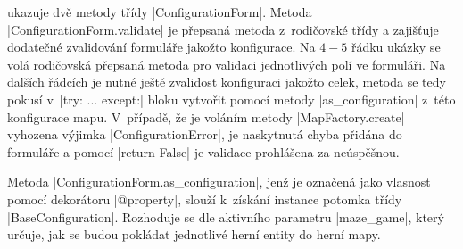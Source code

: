  ukazuje dvě metody třídy \ic|ConfigurationForm|. Metoda \ic|ConfigurationForm.validate| je přepsaná metoda z~rodičovské třídy a zajišťuje dodatečné zvalidování formuláře jakožto konfigurace. Na $4-5$ řádku ukázky se volá rodičovská přepsaná metoda pro validaci jednotlivých polí ve formuláři. Na dalších řádcích je nutné ještě zvalidost konfiguraci jakožto celek, metoda se tedy pokusí v~\ic|try: ... except:| bloku vytvořit pomocí metody \ic|as_configuration| z~této konfigurace mapu. V~případě, že je voláním metody \ic|MapFactory.create| vyhozena výjimka \ic|ConfigurationError|, je naskytnutá chyba přidána do formuláře a pomocí \ic|return False| je validace prohlášena za neúspěšnou. 

\begin{sloppypar}
    Metoda \ic|ConfigurationForm.as_configuration|, jenž je označená jako vlasnost pomocí dekorátoru \ic|@property|, slouží k~získání instance potomka třídy \ic|BaseConfiguration|. Rozhoduje se dle aktivního parametru \ic|maze_game|, který určuje, jak se budou pokládat jednotlivé herní entity do herní mapy.
\end{sloppypar}